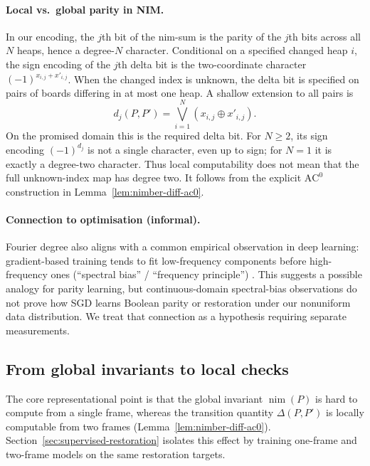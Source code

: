 \documentclass[11pt]{article}
\newcommand{\AC}{\mathrm{AC}}
\theoremstyle{plain}
\theoremstyle{definition}
\theoremstyle{remark}
\numberwithin{equation}{section}
\begin{document}
\paragraph{Local vs.\ global parity in NIM.}
In our encoding, the $j$th bit of the nim-sum is the parity of the $j$th bits across all $N$ heaps, hence a degree-$N$ character.
Conditional on a specified changed heap $i$, the sign encoding of the $j$th delta bit is the two-coordinate character $(-1)^{x_{i,j}+x'_{i,j}}$. When the changed index is unknown, the delta bit is specified on pairs of boards differing in at most one heap. A shallow extension to all pairs is
\begin{equation}
d_j(P,P')=\bigvee_{i=1}^{N}(x_{i,j}\oplus x'_{i,j}).
\label{eq:delta-extension}
\end{equation}
On the promised domain this is the required delta bit. For $N\ge2$, its sign encoding $(-1)^{d_j}$ is not a single character, even up to sign; for $N=1$ it is exactly a degree-two character. Thus local computability does not mean that the full unknown-index map has degree two. It follows from the explicit $\AC^0$ construction in Lemma~\ref{lem:nimber-diff-ac0}.

\paragraph{Connection to optimisation (informal).}
Fourier degree also aligns with a common empirical observation in deep learning: gradient-based training tends to fit low-frequency components before high-frequency ones (``spectral bias'' / ``frequency principle'') \cite{rahaman2019spectral,xu2019frequency}.
This suggests a possible analogy for parity learning, but continuous-domain spectral-bias observations do not prove how SGD learns Boolean parity or restoration under our nonuniform data distribution. We treat that connection as a hypothesis requiring separate measurements.

\subsection{From global invariants to local checks}
The core representational point is that the global invariant $\operatorname{nim}(P)$ is hard to compute from a single frame, whereas the transition quantity $\Delta(P,P')$ is locally computable from two frames (Lemma~\ref{lem:nimber-diff-ac0}).
Section~\ref{sec:supervised-restoration} isolates this effect by training one-frame and two-frame models on the same restoration targets.
\end{document}
